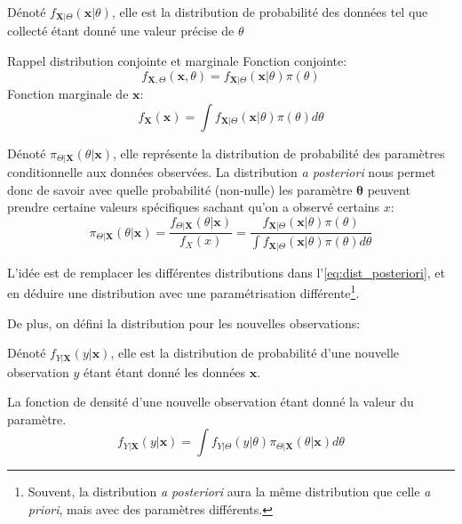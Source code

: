 \documentclass[10pt, french]{article}
\begin{document}
\begin{multicols*}{3}
\begin{definition}
Dénoté $f_{\bm{X} | \Theta}(\bm{x} | \theta)$, elle est la distribution de probabilité des données tel que collecté étant donné une valeur précise de $\theta$ 
\end{definition}

\begin{rappel}{Rappel distribution conjointe et marginale}
Fonction conjointe:
\begin{equation*}
	f_{\bm{X}, \Theta}(\bm{x}, \theta)
	=	f_{\bm{X}|\Theta}(\bm{x} | \theta) \pi(\theta)
\end{equation*}
Fonction marginale de $\bm{x}$:
\begin{equation*}
	f_{\bm{X}}(\bm{x})
	=	\int f_{\bm{X}|\Theta}(\bm{x} | \theta) \pi(\theta) d\theta
\end{equation*}
\end{rappel}


\begin{definition}
Dénoté $\pi_{\Theta | \bm{X}}(\theta | \bm{x})$, elle représente la distribution de probabilité des paramètres conditionnelle aux données observées. 
La distribution \emph{a posteriori} nous permet donc de savoir avec quelle probabilité (non-nulle) les paramètre $\bm\theta$ peuvent prendre certaine valeurs spécifiques sachant qu'on a observé certains $x$: 
\begin{equation}
\label{eq:dist_posteriori}
	\pi_{\Theta | \bm{X}}(\theta | \bm{x})
	= 	\frac{f_{\Theta | \bm{X}}(\theta | \bm{x})}{f_{X}(x)} 
	= 	\frac{f_{\bm{X}|\Theta}(\bm{x} | \theta) \pi(\theta)}{\int f_{\bm{X}|\Theta}(\bm{x} | \theta) \pi(\theta) d\theta} 
\end{equation}

L'idée est de remplacer les différentes distributions dans l'\autoref{eq:dist_posteriori}, et en déduire une distribution avec une paramétrisation différente\footnote{Souvent, la distribution \emph{a posteriori} aura la même distribution que celle \emph{a priori}, mais avec des paramètres différents.}.
\end{definition}

De plus, on défini la distribution pour les nouvelles observations:
\begin{definition}
Dénoté $f_{Y | \bm{X}}(y | \bm{x})$, elle est la distribution de probabilité d'une nouvelle observation $y$ étant étant donné les données $\bm{x}$.

La fonction de densité d'une nouvelle observation étant donné la valeur du paramètre.
\begin{equation*}
	f_{Y | \bm{X}}(y | \bm{x})
	=	\int f_{Y|\Theta}(y | \theta) \pi_{\Theta | \bm{X}}(\theta | \bm{x}) d\theta
\end{equation*}


\end{definition}
\end{multicols*}
\end{document}
